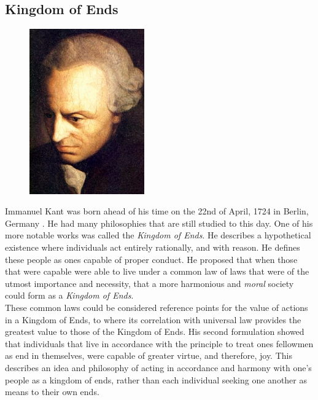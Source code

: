 \documentclass[11pt]{article}
\begin{document}
\pagebreak
\subsection{Kingdom of Ends}

\begin{figure}
    \centering
    \includegraphics[width=0.44\textwidth]{kant.jpg}
\end{figure}

Immanuel Kant was born ahead of his time on the 22nd of April, 1724 in Berlin, Germany \cite{kant}. He had many philosophies that are still studied to this day. 
One of his more notable works was called the \textit{Kingdom of Ends}. 
He describes a hypothetical existence where individuals act entirely rationally, and with reason.
He defines these people as ones capable of proper conduct. 
He proposed that when those that were capable were able to live under a common law of laws that were of the utmost importance and necessity, that a more harmonious and \textit{moral} society could form as a \textit{Kingdom of Ends}.\\

\noindent These common laws could be considered reference points for the value of actions in a Kingdom of Ends, to where its correlation with universal law provides the greatest value to those of the Kingdom of Ends.
His second formulation showed that individuals that live in accordance with the principle to treat ones fellowmen as end in themselves, were capable of greater virtue, and therefore, joy.
This describes an idea and philosophy of acting in accordance and harmony with one's people as a kingdom of ends, rather than each individual seeking one another as means to their own ends.
\end{document}
